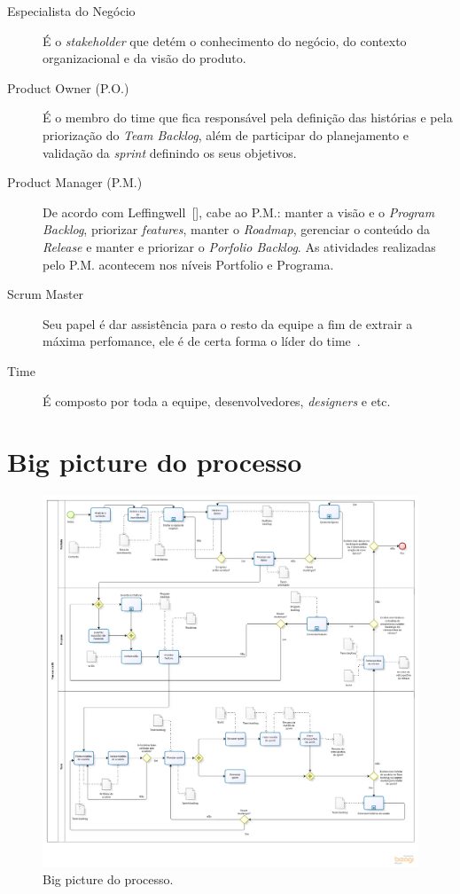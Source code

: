 \begin{description}
\item[Especialista do Negócio] É o \textit{stakeholder} que detém o conhecimento do negócio, do contexto organizacional e da visão do produto.    
\item[Product Owner (P.O.)] É o membro do time que fica responsável pela definição das histórias e pela priorização do \textit{Team Backlog}, além de participar do planejamento e validação da \textit{sprint} definindo os seus objetivos.
\item[Product Manager (P.M.)] De acordo com Leffingwell~[\citeyear{leffingwell}], cabe ao P.M.: manter a visão e o \textit{Program Backlog}, priorizar \textit{features}, manter o \textit{Roadmap}, gerenciar o conteúdo da \textit{Release} e manter e priorizar o \textit{Porfolio Backlog}. As atividades realizadas pelo P.M. acontecem nos níveis Portfolio e Programa.
\item[Scrum Master] Seu papel é dar assistência para o resto da equipe a fim de extrair a máxima perfomance, ele é de certa forma o líder do time~\cite{leffingwell}.
\item[Time] É composto por toda a equipe, desenvolvedores, \textit{designers} e etc.
\end{description}

\section{Big picture do processo}
  \begin{figure}[!htbp]
    \centering
    \includegraphics[scale=0.3]{figuras/Processo_v1-2}
    \caption[Big picture do processo.]{Big picture do processo. \footnotemark}
    \label{processo}
  \end{figure}

